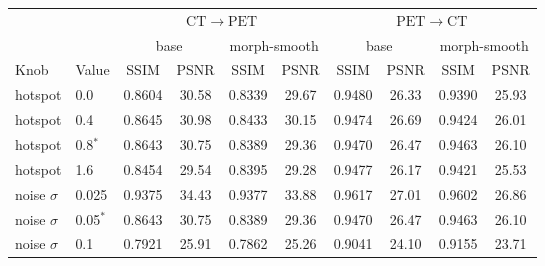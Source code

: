 \begin{tabular}{llcccccccc}
\toprule
& & \multicolumn{4}{c}{$\mathrm{CT}\rightarrow\mathrm{PET}$} & \multicolumn{4}{c}{$\mathrm{PET}\rightarrow\mathrm{CT}$} \\
\cmidrule(lr){3-6}\cmidrule(lr){7-10}
& & \multicolumn{2}{c}{base} & \multicolumn{2}{c}{morph-smooth} & \multicolumn{2}{c}{base} & \multicolumn{2}{c}{morph-smooth} \\
Knob & Value & SSIM & PSNR & SSIM & PSNR & SSIM & PSNR & SSIM & PSNR \\
\midrule
hotspot & 0.0 & 0.8604 & 30.58 & 0.8339 & 29.67 & 0.9480 & 26.33 & 0.9390 & 25.93 \\
hotspot & 0.4 & 0.8645 & 30.98 & 0.8433 & 30.15 & 0.9474 & 26.69 & 0.9424 & 26.01 \\
hotspot & 0.8$^\ast$ & 0.8643 & 30.75 & 0.8389 & 29.36 & 0.9470 & 26.47 & 0.9463 & 26.10 \\
hotspot & 1.6 & 0.8454 & 29.54 & 0.8395 & 29.28 & 0.9477 & 26.17 & 0.9421 & 25.53 \\
\midrule
noise $\sigma$ & 0.025 & 0.9375 & 34.43 & 0.9377 & 33.88 & 0.9617 & 27.01 & 0.9602 & 26.86 \\
noise $\sigma$ & 0.05$^\ast$ & 0.8643 & 30.75 & 0.8389 & 29.36 & 0.9470 & 26.47 & 0.9463 & 26.10 \\
noise $\sigma$ & 0.1 & 0.7921 & 25.91 & 0.7862 & 25.26 & 0.9041 & 24.10 & 0.9155 & 23.71 \\
\bottomrule
\end{tabular}
